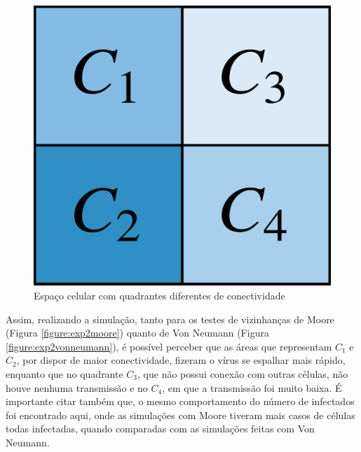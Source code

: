 \documentclass[a4paper,12pt]{article}
\begin{document}
\begin{figure}[!ht]
 \begin{center}
  \includegraphics[width=0.35\linewidth]{fig/area_artificial.png}
 \end{center}
 \caption{Espaço celular com quadrantes diferentes de conectividade}
\label{figure:artificialCellSpace}
\end{figure}

Assim, realizando a simulação, tanto para os testes de vizinhanças de Moore (Figura \ref{figure:exp2moore}) quanto de Von Neumann (Figura \ref{figure:exp2vonneumann}), é possível perceber que as áreas que representam $C_1$ e $C_2$, por dispor de maior conectividade, fizeram o vírus se espalhar mais rápido, enquanto que no quadrante $C_3$, que não possui conexão com outras células, não houve nenhuma transmissão e no $C_4$, em que a transmissão foi muito baixa. É importante citar também que, o mesmo comportamento do número de infectados foi encontrado aqui, onde as simulações com Moore tiveram mais casos de células todas infectadas, quando comparadas com as simulações feitas com Von Neumann.
\end{document}
